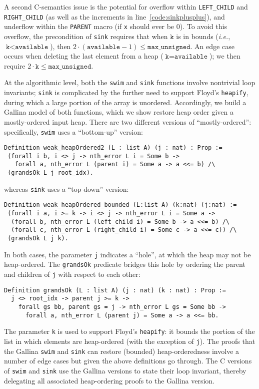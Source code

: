 A second C-semantics issue is the potential for overflow within \texttt{LEFT\_CHILD} and \texttt{RIGHT\_CHILD} (as well as the increments in line~\ref{code:sinkplusplus}), and underflow within the \texttt{PARENT} macro (if \texttt{x} should ever be 0).  To avoid this overflow, the precondition of \texttt{sink} requires that when $\texttt{k}$ is in bounds (\emph{i.e.}, $\texttt{k} < \texttt{available}$), then $2\cdot(\texttt{available}-1) \leq \texttt{max\_unsigned}$.  An edge case occurs when deleting the last element from a heap ($\texttt{k}=\texttt{available}$); we then require $2\cdot\texttt{k}\leq \texttt{max\_unsigned}$.

At the algorithmic level, both the \texttt{swim} and \texttt{sink} functions involve nontrivial loop invariants; \texttt{sink} is complicated by the further need to support Floyd's \texttt{heapify}, during which a large portion of the array is unordered.  Accordingly, we build a Gallina model of both functions, which we show restore heap order given a mostly-ordered input heap.  There are two different versions of ``mostly-ordered'': specifically, \texttt{swim} uses a ``bottom-up'' version:
\begin{lstlisting}
Definition weak_heapOrdered2 (L : list A) (j : nat) : Prop :=
 (forall i b, i <> j -> nth_error L i = Some b ->
   forall a, nth_error L (parent i) = Some a -> a <<= b) /\
 (grandsOk L j root_idx).
\end{lstlisting}
whereas \texttt{sink} uses a ``top-down'' version:
\begin{lstlisting}
Definition weak_heapOrdered_bounded (L:list A) (k:nat) (j:nat) :=
 (forall i a, i >= k -> i <> j -> nth_error L i = Some a ->
  (forall b, nth_error L (left_child i) = Some b -> a <<= b) /\
  (forall c, nth_error L (right_child i) = Some c -> a <<= c)) /\
 (grandsOk L j k).
\end{lstlisting}
In both cases, the parameter \texttt{j} indicates a ``hole'', at which the heap may not be heap-ordered.  The \texttt{grandsOk} predicate bridges this hole by ordering the parent and children of \texttt{j} with respect to each other:
\begin{lstlisting}
Definition grandsOk (L : list A) (j : nat) (k : nat) : Prop :=
  j <> root_idx -> parent j >= k ->
    forall gs bb, parent gs = j -> nth_error L gs = Some bb ->
      forall a, nth_error L (parent j) = Some a -> a <<= bb.
\end{lstlisting}
The parameter \texttt{k} is used to support Floyd's \texttt{heapify}: it bounds the portion of the list in which elements are heap-ordered (with the exception of \texttt{j}).  The proofs that the Gallina \texttt{swim} and \texttt{sink} can restore (bounded) heap-orderedness involve a number of edge cases but given the above definitions go through.  The C versions of \texttt{swim} and \texttt{sink} use the Gallina versions to state their loop invariant, thereby delegating all associated heap-ordering proofs to the Gallina version.

